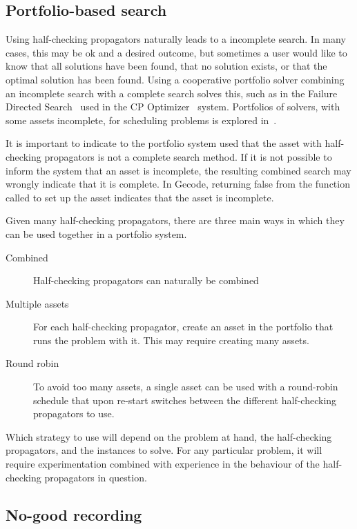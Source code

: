 \documentclass[runningheads]{llncs}
\begin{document}
\subsection{Portfolio-based search}
\label{sec:portfolio}

Using half-checking propagators naturally leads to a incomplete
search. In many cases, this may be ok and a desired outcome, but
sometimes a user would like to know that all solutions have been
found, that no solution exists, or that the optimal solution has been
found. Using a cooperative portfolio solver combining an incomplete
search with a complete search solves this, such as in the Failure
Directed Search~\cite{failure-directed-search} used in the CP
Optimizer~\cite{cpoptimizer} system. Portfolios of
solvers, with some assets incomplete, for scheduling problems is
explored in~\cite{Fontaine16}.

It is important to indicate to the portfolio system used that the
asset with half-checking propagators is not a complete search
method. If it is not possible to inform the system that an asset is
incomplete, the resulting combined search may wrongly indicate that it
is complete. In Gecode, returning false from the function called to
set up the asset indicates that the asset is incomplete.

Given many half-checking propagators, there are three main ways in which
they can be used together in a portfolio system.
\begin{description}
\item[Combined] Half-checking propagators can naturally be combined
\item[Multiple assets] For each half-checking propagator, create an
  asset in the portfolio that runs the problem with it. This may
  require creating many assets.
\item[Round robin] To avoid too many assets, a single asset can be
  used with a round-robin schedule that upon re-start switches between
  the different half-checking propagators to use.
\end{description}
Which strategy to use will depend on the problem at hand, the
half-checking propagators, and the instances to solve. For any
particular problem, it will require experimentation combined with
experience in the behaviour of the half-checking propagators in question.

\subsection{No-good recording}
\label{sec:no-good}
\end{document}
